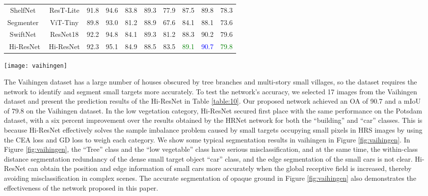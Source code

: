 \documentclass[journal]{IEEEtran}
\begin{document}
\begin{table*}[!t]
\begin{center}
{\begin{tabular}{c|c c c c c c c c c}
      ShelfNet~\cite{zhuang2019shelfnet} & ResT-Lite & 91.8 & 94.6 & 83.8 & 89.3 & 77.9 & 87.5 & 89.8 & 78.3\\
      Segmenter~\cite{strudel2021segmenter} & ViT-Tiny & 89.8 & 93.0 & 81.2 & 88.9 & 67.6 & 84.1 & 88.1 & 73.6\\
      SwiftNet~\cite{orvsic2021efficient}& ResNet18 & 92.2 & 94.8 & 84.1 & 89.3 & 81.2 & 88.3 & 90.2 & 79.6\\
      \hline
      Hi-ResNet & Hi-ResNet & 92.3 & 95.1 & 84.9 & 88.5 & 83.5 & \textcolor{green}{89.1} & \textcolor{blue}{90.7} & \textcolor{green}{79.8}\\
      \hline
    \end{tabular}}
  \end{center}
  \label{table:10}
\end{table*}

\begin{figure*}[t!]
    \centering
    \texttt{[image: vaihingen]}
    \caption{Visualization results for the Vaihingen validation set. From left to right: original image, ground truth, results of HRNet~\cite{wang2020deep}, results of PSPNet~\cite{zhao2017pyramid}, results of DANet~\cite{li2019dabnet}, results of Segmenter~\cite{strudel2021segmenter}, results of DeepLabv3+~\cite{chen2018encoder}, and results of our Hi-ResNet.}
    \label{fig:vaihingen}
\end{figure*}

The Vaihingen dataset has a large number of houses obscured by tree branches and multi-story small villages, so the dataset requires the network to identify and segment small targets more accurately. To test the network's accuracy, we selected 17 images from the Vaihingen dataset and present the prediction results of the Hi-ResNet in Table \ref{table:10}. Our proposed network achieved an OA of 90.7 and a mIoU of 79.8 on the Vaihingen dataset. In the low vegetation category, Hi-ResNet secured first place with the same performance on the Potsdam dataset, with a six percent improvement over the results obtained by the HRNet network for both the ``building'' and ``car'' classes. This is because Hi-ResNet effectively solves the sample imbalance problem caused by small targets occupying small pixels in HRS images by using the CEA loss and GD loss to weigh each category. 
We show some typical segmentation results in vaihingen in Figure \ref{fig:vaihingen}. In Figure \ref{fig:vaihingen}, the ``Tree'' class and the ``low vegetable'' class have serious misclassification, and at the same time, the within-class distance segmentation redundancy of the dense small target object ``car'' class, and the edge segmentation of the small cars is not clear. Hi-ResNet can obtain the position and edge information of small cars more accurately when the global receptive field is increased, thereby avoiding misclassification in complex scenes. The accurate segmentation of opaque ground in Figure \ref{fig:vaihingen} also demonstrates the effectiveness of the network proposed in this paper.
\end{document}
